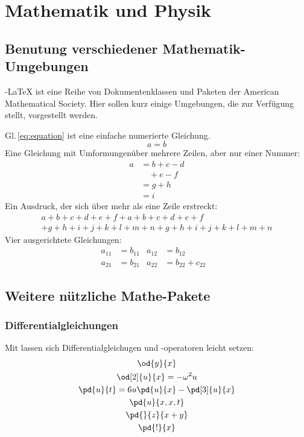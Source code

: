 \cleardoublepage

\chapter{Mathematik und Physik}
\section{Benutung verschiedener Mathematik-Umgebungen}
{\AmS}-{\LaTeX} ist eine Reihe von Dokumentenklassen und Paketen der American Mathematical Society. Hier sollen kurz einige Umgebungen, die  zur Verfügung stellt, vorgestellt werden.

Gl.\,\ref{eq:equation} ist eine einfache numerierte Gleichung.
\begin{equation}\label{eq:equation}
 a = b
\end{equation}
Eine Gleichung mit Umformungenüber mehrere Zeilen, aber nur einer Nummer:
\begin{equation}
 \begin{split}
  a& = b+c-d\\
   & \quad + e - f\\
   & = g+h\\
   & = i
 \end{split}
\end{equation}
Ein Ausdruck, der sich über mehr als eine Zeile erstreckt:
\begin{multline}
 a + b + c +d + e + f + a + b + c +d + e + f \\
 + g + h + i + j + k + l + m + n+ g + h + i + j + k + l + m + n
\end{multline}
Vier ausgerichtete Gleichungen:
\begin{align}
 a_{11}& = b_{11}&
 a_{12}& = b_{12}&\\
 a_{21}& = b_{21}&
 a_{22}& = b_{22} + c_{22}
\end{align}
\section{Weitere nützliche Mathe-Pakete}
\subsection{Differentialgleichungen}
Mit  lassen sich Differentialgleichugen und -operatoren leicht setzen:
\begin{gather}
 \od{y}{x}\\
 \od[2]{u}{x} = -\omega^2 u\\
 \pd{u}{t} = 6u \pd{u}{x} - \pd[3]{u}{x}\\
 \pd{u}{x,x,t}\\
 \pd{}{z}{x+y}\\
 \pd{!}{x}
\end{gather}
